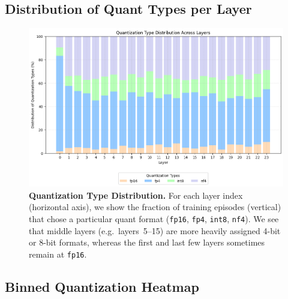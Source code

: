 \documentclass{article}
\begin{document}
	\subsection{Distribution of Quant Types per Layer}
	\label{sec:medium-quant-dist}
	
	\begin{figure}[ht]
		\centering
		\includegraphics[width=0.85\linewidth]{images/gpt2-medium-250-gae-ewa-rwd-v1/layer_distribution_plot.png}
		\caption{\small
			\textbf{Quantization Type Distribution.}
			For each layer index (horizontal axis), we show the fraction of training episodes (vertical) that chose a particular quant format (\texttt{fp16}, \texttt{fp4}, \texttt{int8}, \texttt{nf4}). 
			We see that middle layers (e.g.\ layers~5--15) are more heavily assigned 4-bit or 8-bit formats, whereas the first and last few layers sometimes remain at \texttt{fp16}.
		}
		\label{fig:gpt2medium-quant-dist}
	\end{figure}
	
	\subsection{Binned Quantization Heatmap}
	\label{sec:medium-heatmap}
	
\end{document}
